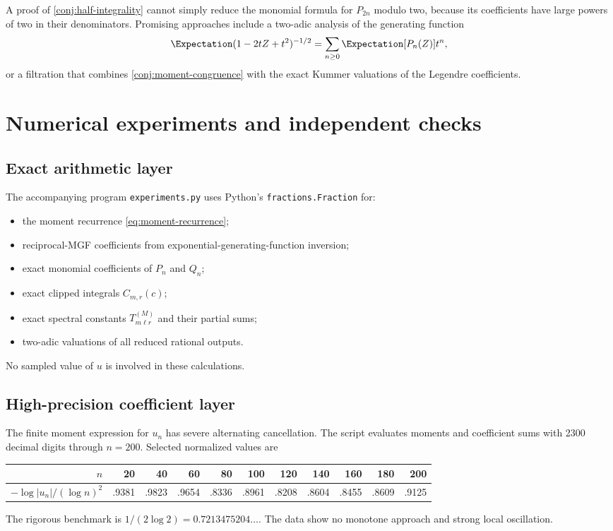 \documentclass[11pt,oneside]{article}
\numberwithin{equation}{section}
\theoremstyle{definition}
\theoremstyle{remark}
\begin{document}
A proof of \cref{conj:half-integrality} cannot simply reduce the monomial
formula for $P_{2n}$ modulo two, because its coefficients have large powers of
two in their denominators.  Promising approaches include a two-adic analysis
of the generating function
\[
 \Expectation(1-2tZ+t^2)^{-1/2}
 =\sum_{n\ge0}\Expectation[P_n(Z)]t^n,
\]
or a filtration that combines \cref{conj:moment-congruence} with the exact
Kummer valuations of the Legendre coefficients.

\section{Numerical experiments and independent checks}
\label{sec:numerics}

\subsection{Exact arithmetic layer}

The accompanying program \texttt{experiments.py} uses Python's
\texttt{fractions.Fraction} for:
\begin{itemize}
  \item the moment recurrence \eqref{eq:moment-recurrence};
  \item reciprocal-MGF coefficients from exponential-generating-function
  inversion;
  \item exact monomial coefficients of $P_n$ and $Q_n$;
  \item exact clipped integrals $C_{m,r}(c)$;
  \item exact spectral constants $T_{m\ell r}^{(M)}$ and their partial sums;
  \item two-adic valuations of all reduced rational outputs.
\end{itemize}
No sampled value of $u$ is involved in these calculations.

\subsection{High-precision coefficient layer}

The finite moment expression for $u_n$ has severe alternating cancellation.
The script evaluates moments and coefficient sums with 2300 decimal digits
through $n=200$.  Selected normalized values are
\begin{center}
\begin{tabular}{@{}rrrrrrrrrrr@{}}
\toprule
$n$&20&40&60&80&100&120&140&160&180&200\\
\midrule
$-\log|u_n|/(\log n)^2$
&.9381&.9823&.9654&.8336&.8961&.8208&.8604&.8455&.8609&.9125\\
\bottomrule
\end{tabular}
\end{center}
The rigorous benchmark is
$1/(2\log2)=0.7213475204\ldots$.  The data show no monotone approach and strong
local oscillation.
\end{document}
